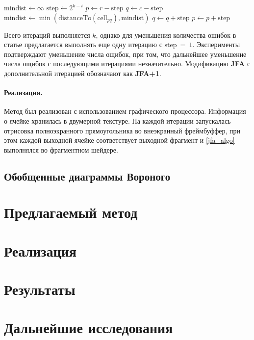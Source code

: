 \documentclass[12pt]{article}
\begin{document}
\begin{algorithmic}
\label{jfa_algo}
\State $\mathrm{mindist} \leftarrow \infty$
\State $\mathrm{step} \gets 2^{k - i}$
\State $p \gets r - \mathrm{step}$
	\State $q \gets c - \mathrm{step}$
			\State $\mathrm{mindist} \gets 
 					\min(\mathrm{distanceTo}(\mathrm{cell}_{pq}), \mathrm{mindist})$
		\EndIf
		\State $q \gets q + \mathrm{step}$
 	\EndWhile
\State $p \gets p + \mathrm{step}$
\EndWhile
\end{algorithmic}

Всего итераций выполняется $k$, однако для уменьшения количества ошибок в статье предлагается выполнять еще одну итерацию с $\mathrm{step}~=~1$. Эксперименты подтверждают уменьшение числа ощибок, при том, что дальнейшее уменьшение числа ощибок с последующими итерациями незначительно. Модификацию \textbf{JFA} с дополнительной итерацией обозначают как \textbf{JFA+1}.

\paragraph{Реализация.} Метод был реализован с использованием графического процессора. Информация о ячейке хранилась в двумерной текстуре. На каждой итерации запускалась отрисовка полноэкранного прямоугольника во внеэкранный фреймбуффер, при этом каждой выходной ячейке соответствует выходной фрагмент и \ref{jfa_algo} выполнялся во фрагментном шейдере.

\subsection{Обобщенные диаграммы Вороного}


\section{Предлагаемый метод}
\section{Реализация}
\section{Результаты}
\section{Дальнейшие исследования}
\end{document}
